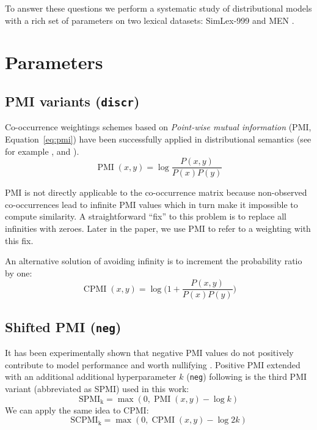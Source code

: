 \documentclass[11pt]{article}
\begin{document}
To answer these questions we perform a systematic study of distributional models with a rich set of parameters on two lexical datasets: SimLex-999 \cite{hill2014simlex} and MEN \cite{Bruni:2014:MDS:2655713.2655714}.

\section{Parameters}
\label{sec:parameters}



\subsection{PMI variants (\texttt{discr})}
\label{sec:pmi-variants}

Co-occurrence weightings schemes based on \emph{Point-wise mutual information} (PMI, Equation~\ref{eq:pmi}) have been successfully applied in distributional semantics (see for example ,  and ).
%
\begin{equation}
  \label{eq:pmi}
  \operatorname{PMI}(x, y) = \log\frac{P(x,y)}{P(x)P(y)}
\end{equation}

PMI is not directly applicable to the co-occurrence matrix because non-observed co-occurrences lead to infinite PMI values which in turn make it impossible to compute similarity. A straightforward ``fix'' to this problem is to replace all infinities with zeroes. Later in the paper, we use PMI to refer to a weighting with this fix.

An alternative solution of avoiding infinity is to increment the probability ratio by one:
%
\begin{equation}
  \label{eq:cpmi}
  \operatorname{CPMI}(x, y) = \log\Big( 1 + \frac{P(x,y)}{P(x)P(y)} \Big)
\end{equation}



\subsection{Shifted PMI (\texttt{neg})}
\label{sec:shifted-pmi}

It has been experimentally shown that negative PMI values do not positively contribute to model performance and worth nullifying \cite{Turney:2010:FMV:1861751.1861756}. Positive PMI extended with an additional additional hyperparameter $k$ (\texttt{neg}) following  is the third PMI variant (abbreviated as SPMI) used in this work:
%
\begin{equation}
  \label{eq:ppmi}
  \operatorname{SPMI_k} = \max (0, \operatorname{PMI}(x, y) - \log k)
\end{equation}
%
We can apply the same idea to CPMI:
%
\begin{equation}
  \label{eq:pcpmi}
  \operatorname{SCPMI_k} = \max (0, \operatorname{CPMI}(x, y) - \log 2k)
\end{equation}
\end{document}
